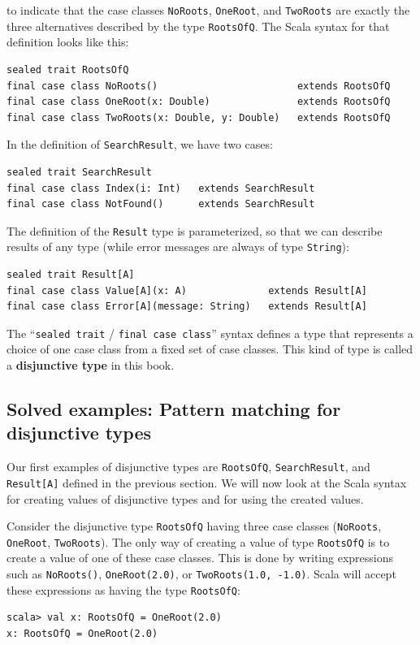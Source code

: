 to indicate that the case classes \lstinline!NoRoots!, \lstinline!OneRoot!,
and \lstinline!TwoRoots! are exactly the three alternatives described
by the type \lstinline!RootsOfQ!. The Scala syntax for that definition
looks like this:
\begin{lstlisting}
sealed trait RootsOfQ
final case class NoRoots()                        extends RootsOfQ
final case class OneRoot(x: Double)               extends RootsOfQ
final case class TwoRoots(x: Double, y: Double)   extends RootsOfQ
\end{lstlisting}
In the definition of \lstinline!SearchResult!, we have two cases:
\begin{lstlisting}
sealed trait SearchResult
final case class Index(i: Int)   extends SearchResult
final case class NotFound()      extends SearchResult
\end{lstlisting}
The definition of the \lstinline!Result! type is parameterized, so
that we can describe results of any type (while error messages are
always of type \lstinline!String!):
\begin{lstlisting}
sealed trait Result[A]
final case class Value[A](x: A)              extends Result[A]
final case class Error[A](message: String)   extends Result[A]
\end{lstlisting}

The ``\lstinline!sealed trait! / \lstinline!final case class!''
syntax defines a type that represents a choice of one case class from
a fixed set of case classes. This kind of type is called a \textbf{disjunctive
type} in this book. 

\subsection{Solved examples: Pattern matching for disjunctive types}

Our first examples of disjunctive types are \lstinline!RootsOfQ!,
\lstinline!SearchResult!, and \lstinline!Result[A]! defined in the
previous section. We will now look at the Scala syntax for creating
values of disjunctive types and for using the created values.

Consider the disjunctive type \lstinline!RootsOfQ! having three case
classes (\lstinline!NoRoots!, \lstinline!OneRoot!, \lstinline!TwoRoots!).
The only way of creating a value of type \lstinline!RootsOfQ! is
to create a value of one of these case classes. This is done by writing
expressions such as \lstinline!NoRoots()!, \lstinline!OneRoot(2.0)!,
or \lstinline!TwoRoots(1.0, -1.0)!. Scala will accept these expressions
as having the type \lstinline!RootsOfQ!:
\begin{lstlisting}
scala> val x: RootsOfQ = OneRoot(2.0)
x: RootsOfQ = OneRoot(2.0)
\end{lstlisting}

